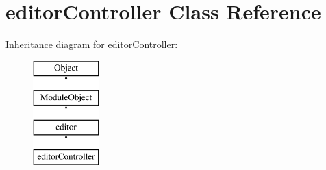 \hypertarget{classeditorController}{}\section{editor\+Controller Class Reference}
\label{classeditorController}
Inheritance diagram for editor\+Controller\+:\begin{figure}[H]
\begin{center}
\leavevmode
\includegraphics[height=4.000000cm]{classeditorController}
\end{center}
\end{figure}
